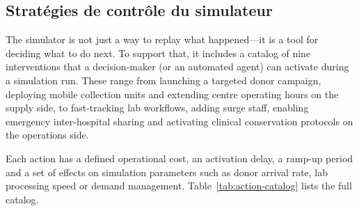 


\subsection{Stratégies de contrôle du simulateur}
\label{sec:control-strategies-design}

The simulator is not just a way to replay what happened---it is a tool for
deciding what to do next.  To support that, it includes a catalog of nine
interventions that a decision-maker (or an automated agent) can activate
during a simulation run.  These range from launching a targeted donor
campaign, deploying mobile collection units and extending centre operating
hours on the supply side, to fast-tracking lab workflows, adding surge staff,
enabling emergency inter-hospital sharing and activating clinical conservation
protocols on the operations side.

Each action has a defined operational cost, an activation delay, a ramp-up
period and a set of effects on simulation parameters such as donor arrival
rate, lab processing speed or demand management.
Table~\ref{tab:action-catalog} lists the full catalog.

